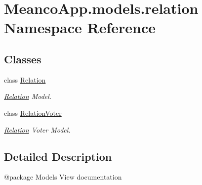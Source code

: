 \hypertarget{namespace_meanco_app_1_1models_1_1relation}{}\section{Meanco\+App.\+models.\+relation Namespace Reference}
\label{namespace_meanco_app_1_1models_1_1relation}
\subsection*{Classes}
\begin{DoxyCompactItemize}
\item 
class \hyperlink{class_meanco_app_1_1models_1_1relation_1_1_relation}{Relation}
\begin{DoxyCompactList}\small\item\em \hyperlink{class_meanco_app_1_1models_1_1relation_1_1_relation}{Relation} Model. \end{DoxyCompactList}\item 
class \hyperlink{class_meanco_app_1_1models_1_1relation_1_1_relation_voter}{Relation\+Voter}
\begin{DoxyCompactList}\small\item\em \hyperlink{class_meanco_app_1_1models_1_1relation_1_1_relation}{Relation} Voter Model. \end{DoxyCompactList}\end{DoxyCompactItemize}


\subsection{Detailed Description}
\begin{DoxyVerb}@package Models
View documentation\end{DoxyVerb}
 